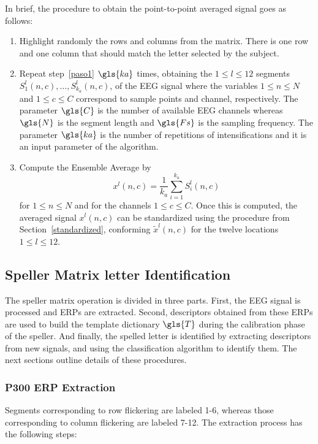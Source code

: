 \begin{itemize}
In brief, the procedure to obtain the point-to-point averaged signal goes as follows:

\begin{enumerate}
\item \label{paso1}Highlight randomly the rows and columns from the matrix.  There is one row and one column that should match the letter selected by the subject.
\item  \label{paso2} Repeat step~\ref{paso1} $\gls{ka}$ times, obtaining the $1 \leq l \leq 12$ segments $S_1^l(n,c),\dots,S_{k_a}^l(n,c)$, of the EEG signal where the variables $1 \leq n \leq N$ and $1 \leq c \leq C$  correspond to sample points and channel, respectively. The parameter $\gls{C}$ is the number of available EEG channels whereas $\gls{N}$ is the segment length and $\gls{Fs}$ is the sampling frequency.  The parameter $\gls{ka}$ is the number of repetitions of intensifications and it is an input parameter of the algorithm.
\item \label{paso3} Compute the Ensemble Average by
\begin{equation}
x^l(n,c)= \frac{1}{k_a}\sum_{i=1}^{k_a}S_i^l(n,c) 
\label{averaging}
\end{equation}  
for $1 \leq n \leq N$ and for the channels $1 \leq c \leq C$. Once this is computed,  the averaged signal $x^l(n,c)$ can be standardized using the procedure from Section~\ref{standardized}, conforming $\tilde{x}^l(n,c)$ for the twelve locations $ 1 \leq l \leq 12$.
\end{enumerate}
\end{itemize}


\subsection{Speller Matrix letter Identification}
\label{Classification}

The speller matrix operation is divided in three parts.  First, the EEG signal is processed and ERPs are extracted.  Second, descriptors obtained from these ERPs are used to build the template dictionary $\gls{T}$ during the calibration phase of the speller. And finally, the spelled letter is identified by extracting descriptors from new signals, and using the classification algorithm to identify them.  The next sections outline details of these procedures.

\subsubsection{P300 ERP Extraction}
Segments corresponding to row flickering are labeled 1-6, whereas those corresponding to column flickering are labeled 7-12.  The extraction process has the following steps:

